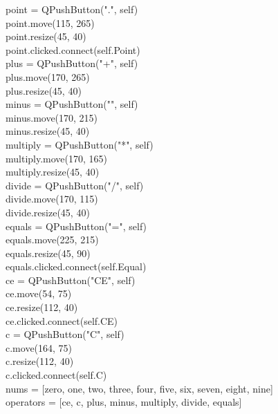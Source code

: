         point = QPushButton(".", self)\\
        point.move(115, 265)\\
        point.resize(45, 40)\\
        point.clicked.connect(self.Point)\\

plus = QPushButton("+", self)\\
        plus.move(170, 265)\\
        plus.resize(45, 40)\\

        minus = QPushButton("\-", self)\\
        minus.move(170, 215)\\
        minus.resize(45, 40)\\

        multiply = QPushButton("*", self)\\
        multiply.move(170, 165)\\
        multiply.resize(45, 40)\\

        divide = QPushButton("/", self)\\
        divide.move(170, 115)\\
        divide.resize(45, 40)\\

        equals = QPushButton("=", self)\\
        equals.move(225, 215)\\
        equals.resize(45, 90)\\
        equals.clicked.connect(self.Equal)\\

ce = QPushButton("CE", self)\\
        ce.move(54, 75)\\
        ce.resize(112, 40)\\
        ce.clicked.connect(self.CE)\\

        c = QPushButton("C", self)\\
        c.move(164, 75)\\
        c.resize(112, 40)\\
        c.clicked.connect(self.C)\\


        nums = [zero, one, two, three, four, five, six, seven, eight, nine]\\

        operators = [ce, c, plus, minus, multiply, divide, equals]\\

